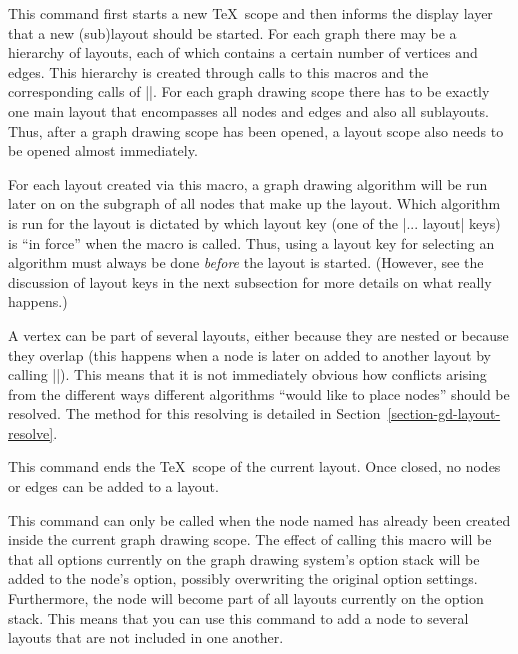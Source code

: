 \begin{command}{\pgfgdbeginlayout}
  This command first starts a new \TeX\ scope and then informs the
  display layer that a new (sub)layout should be started. For each
  graph there may be a hierarchy of layouts, each of which contains a
  certain number of vertices and edges. This hierarchy is created
  through calls to this macros and the corresponding calls of
  |\pgfgdendlayout|. For each graph drawing scope there has to be
  exactly one main layout that encompasses all nodes and edges and
  also all sublayouts. Thus, after a graph drawing scope has been
  opened, a layout scope also needs to be opened almost immediately.
  
  For each layout created via this macro, a graph drawing algorithm
  will be run later on on the subgraph of all nodes that make up the
  layout. Which algorithm is run for the layout is dictated by which
  layout key (one of the |... layout| keys) is ``in force'' when the
  macro is called. Thus, using a layout key for selecting an algorithm
  must always be done \emph{before} the layout is started. (However,
  see the discussion of layout keys in the next subsection for more
  details on what really happens.) 

  A vertex can be part of several layouts, either because they are
  nested or because they overlap (this happens when a node is later on
  added to another layout by calling |\pgfgdsetlatenodeoption|). This
  means that it is not immediately obvious how conflicts arising from
  the different ways different algorithms ``would like to place
  nodes'' should be resolved. The method for this resolving is
  detailed in Section~\ref{section-gd-layout-resolve}. 
\end{command}

\begin{command}{\pgfgdendlayout}
  This command ends the \TeX\ scope of the current layout. Once
  closed, no nodes or edges can be added to a layout.
\end{command}


\begin{command}{\pgfgdsetlatenodeoption{}}
  This command can only be called when the node named 
  has already been created inside the current graph drawing scope. The
  effect of calling this macro will be that all options currently on
  the graph drawing system's option stack will be added to the node's
  option, possibly overwriting the original option
  settings. Furthermore, the node will become part of all layouts
  currently on the option stack. This means that you can use this
  command to add a node to several layouts that are not included in
  one another. 
\end{command}



